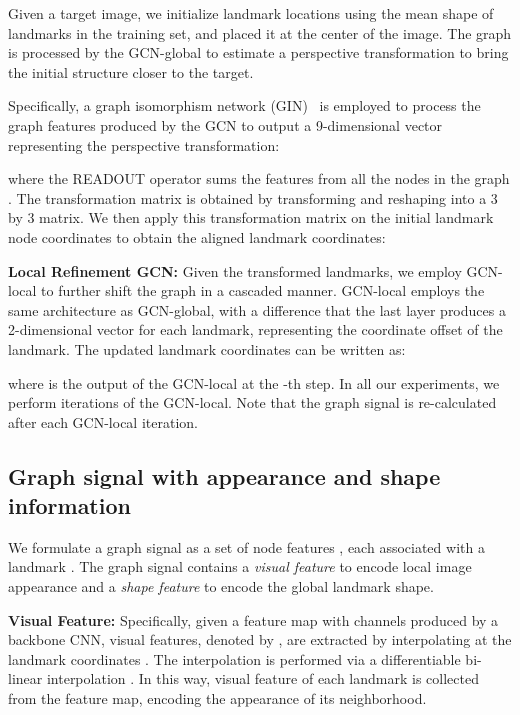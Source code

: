 \documentclass[runningheads]{llncs}
\begin{document}
Given a target image, we initialize landmark locations  using the mean shape of landmarks in the training set, and placed it at the center of the image. The graph is processed by the GCN-global to estimate a perspective transformation to bring the initial structure closer to the target. 

Specifically, a graph isomorphism network (GIN)~\cite{xu2018powerful} is employed to process the graph features  produced by the GCN to output a 9-dimensional vector representing the perspective transformation:

where the READOUT operator sums the features from all the nodes in the graph . The transformation matrix  is obtained by transforming and reshaping  into a 3 by 3 matrix. We then apply this transformation matrix on the initial landmark node coordinates to obtain the aligned landmark coordinates:


\textbf{Local Refinement GCN:}
Given the transformed landmarks, we employ GCN-local to further shift the graph in a cascaded manner.
GCN-local employs the same architecture as GCN-global, with a difference that the last layer produces a 2-dimensional vector for each landmark, representing the coordinate offset of the landmark. The updated landmark coordinates can be written as:

where  is the output of the GCN-local at the -th step. In all our experiments, we perform  iterations of the GCN-local. Note that the graph signal is re-calculated after each GCN-local iteration. 



\subsection{Graph signal with appearance and shape information}
\label{subsec:graphsignal}

We formulate a graph signal  as a set of node features , each associated with a landmark . The graph signal contains a \textit{visual feature} to encode local image appearance and a \textit{shape feature} to encode the global landmark shape. 

\textbf{Visual Feature:} Specifically, given a feature map  with  channels produced by a backbone CNN, visual features, denoted by , are extracted by interpolating  at the landmark coordinates . The interpolation is performed via a differentiable bi-linear interpolation \cite{jaderberg2015spatial}. In this way, visual feature of each landmark is collected from the feature map, encoding the appearance of its neighborhood.
\end{document}
